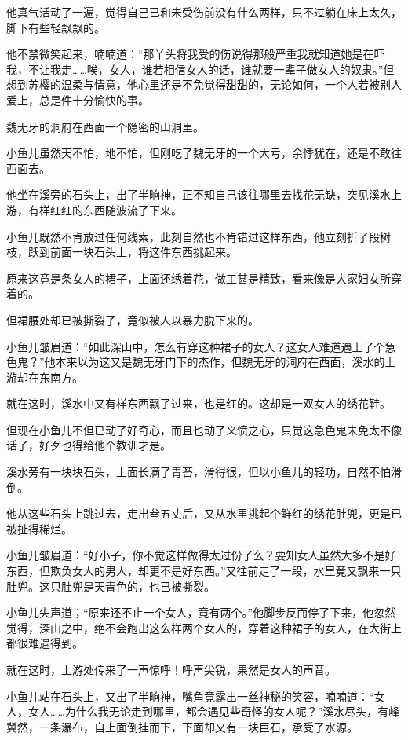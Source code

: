 \documentclass[12pt,oneside]{book}
\begin{document}
他真气活动了一遍，觉得自己已和未受伤前没有什么两样，只不过躺在床上太久，脚下有些轻飘飘的。

他不禁微笑起来，喃喃道：``那丫头将我受的伤说得那般严重我就知道她是在吓我，不让我走\ldots\ldots 唉，女人，谁若相信女人的话，谁就要一辈子做女人的奴隶。''但想到苏樱的温柔与情意，他心里还是不免觉得甜甜的，无论如何，一个人若被别人爱上，总是件十分愉快的事。

魏无牙的洞府在西面一个隐密的山洞里。

小鱼儿虽然天不怕，地不怕，但刚吃了魏无牙的一个大亏，余悸犹在，还是不敢往西面去。

他坐在溪旁的石头上，出了半晌神，正不知自己该往哪里去找花无缺，突见溪水上游，有样红红的东西随波流了下来。

小鱼儿既然不肯放过任何线索，此刻自然也不肯错过这样东西，他立刻折了段树枝，跃到前面一块石头上，将这件东西挑起来。

原来这竟是条女人的裙子，上面还绣着花，做工甚是精致，看来像是大家妇女所穿着的。

但裙腰处却已被撕裂了，竟似被人以暴力脱下来的。

小鱼儿皱眉道：``如此深山中，怎么有穿这种裙子的女人？这女人难道遇上了个急色鬼？''他本来以为这又是魏无牙门下的杰作，但魏无牙的洞府在西面，溪水的上游却在东南方。

就在这时，溪水中又有样东西飘了过来，也是红的。这却是一双女人的绣花鞋。

但现在小鱼儿不但已动了好奇心，而且也动了义愤之心，只觉这急色鬼未免太不像话了，好歹也得给他个教训才是。

溪水旁有一块块石头，上面长满了青苔，滑得很，但以小鱼儿的轻功，自然不怕滑倒。

他从这些石头上跳过去，走出叁五丈后，又从水里挑起个鲜红的绣花肚兜，更是已被扯得稀烂。

小鱼儿皱眉道：``好小子，你不觉这样做得太过份了么？要知女人虽然大多不是好东西，但欺负女人的男人，却更不是好东西。''又往前走了一段，水里竟又飘来一只肚兜。这只肚兜是天青色的，也已被撕裂。

小鱼儿失声道；``原来还不止一个女人，竟有两个。''他脚步反而停了下来，他忽然觉得，深山之中，绝不会跑出这么样两个女人的，穿着这种裙子的女人，在大街上都很难遇得到。

就在这时，上游处传来了一声惊呼！呼声尖锐，果然是女人的声音。

小鱼儿站在石头上，又出了半晌神，嘴角竟露出一丝神秘的笑容，喃喃道：``女人，女人\ldots\ldots 为什么我无论走到哪里，都会遇见些奇怪的女人呢？''溪水尽头，有峰冀然，一条瀑布，自上面倒挂而下，下面却又有一块巨石，承受了水源。
\end{document}
